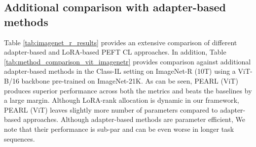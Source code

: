\documentclass[10pt]{article} %
\begin{document}





\subsection{Additional comparison with adapter-based methods}

Table \ref{tab:imagenet_r_results} provides an extensive comparison of different adapter-based and LoRA-based PEFT CL approaches. In addition, Table \ref{tab:method_comparison_vit_imagenetr}  provides comparison against additional adapter-based methods in the Class-IL setting on ImageNet-R (10T) using a ViT-B/16 backbone pre-trained on ImageNet-21K. As can be seen, PEARL (ViT) produces superior performance across both the metrics and beats the baselines by a large margin. Although LoRA-rank allocation is dynamic in our framework, PEARL (ViT) leaves slightly more number of parameters compared to adapter-based approaches. Although adapter-based methods are parameter efficient, We note that their performance is sub-par and can be even worse in longer task sequences. 
\end{document}

